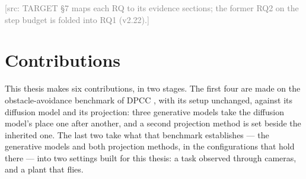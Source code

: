 \documentclass[headsepline,footsepline,footinclude=false,oneside,fontsize=11pt,paper=a4,listof=totoc,bibliography=totoc]{scrbook}
\theoremstyle{definition}
\theoremstyle{plain}
\theoremstyle{remark}
\newif\ifsubmission
\newcommand{\srcnote}[1]{\ifsubmission\else\textcolor{gray}{\footnotesize\textsf{[src: #1]}}\fi}
\begin{document}
\srcnote{TARGET \S7 maps each RQ to its evidence sections; the former RQ2 on the step budget is
folded into RQ1 (v2.22).}

\section{Contributions}\label{sec:intro:contributions}

This thesis makes six contributions, in two stages. The first four are made on the obstacle-avoidance
benchmark of \ac{DPCC} \parencite{romer2025diffusion,jia2024towards}, with its setup unchanged, against
its diffusion model and its projection: three generative models take the diffusion model's place one
after another, and a second projection method is set beside the inherited one. The last two take what
that benchmark establishes --- the generative models and both projection methods, in the
configurations that hold there --- into two settings built for this thesis: a task observed through
cameras, and a plant that flies.
\end{document}
